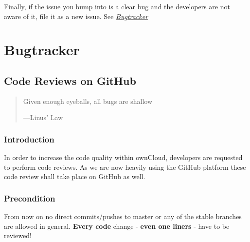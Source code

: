 \documentclass[letterpaper,10pt,english]{sphinxmanual}
\begin{document}
Finally, if the issue you bump into is a clear bug and the developers are not aware of it, file it as a new issue. See {\hyperref[bugtracker/index::doc]{\emph{\emph{Bugtracker}}}}


\section{Bugtracker}
\label{bugtracker/index:bugtracker}\label{bugtracker/index::doc}

\subsection{Code Reviews on GitHub}
\label{bugtracker/codereviews::doc}\label{bugtracker/codereviews:code-reviews-on-github}\begin{quote}

Given enough eyeballs, all bugs are shallow

\begin{flushright}
---Linus' Law
\end{flushright}
\end{quote}


\subsubsection{Introduction}
\label{bugtracker/codereviews:introduction}
In order to increase the code quality within ownCloud, developers are requested
to perform code reviews.  As we are now heavily using the GitHub platform these
code review shall take place on GitHub as well.


\subsubsection{Precondition}
\label{bugtracker/codereviews:precondition}
From now on no direct commits/pushes to master or any of the stable branches are
allowed in general.  \textbf{Every code} change - \textbf{even one liners} - have to be
reviewed!
\end{document}
